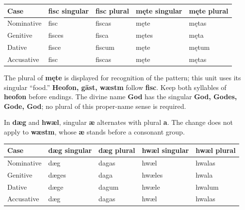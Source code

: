 \par\begingroup
\fontsize{10.5}{13.2}\selectfont
\setlength{\LTleft}{0pt}\setlength{\LTright}{\fill}
\noindent
\begin{tabular}{@{}>{\raggedright\arraybackslash}p{22.0mm}>{\raggedright\arraybackslash}p{22.688mm}>{\raggedright\arraybackslash}p{22.688mm}>{\raggedright\arraybackslash}p{22.688mm}>{\raggedright\arraybackslash}p{22.688mm}@{}}
\toprule
\textbf{Case} & \textbf{fisc singular} & \textbf{fisc plural} & \textbf{męte singular} & \textbf{męte plural} \\
\midrule
Nominative & fisc & fiscas & męte & mętas \\
Genitive & fisces & fisca & mętes & męta \\
Dative & fisce & fiscum & męte & mętum \\
Accusative & fisc & fiscas & męte & mętas \\
\bottomrule
\end{tabular}
\par\endgroup

The plural of \textbf{męte} is displayed for recognition of the pattern; this unit uses its singular “food.” \textbf{Heofon, gāst, wæstm} follow \textbf{fisc}. Keep both syllables of \textbf{heofon} before endings. The divine name \textbf{God} has the singular \textbf{God, Godes, Gode, God}; no plural of this proper-name sense is required.

In \textbf{dæg} and \textbf{hwæl}, singular \textbf{æ} alternates with plural \textbf{a}. The change does not apply to \textbf{wæstm}, whose \textbf{æ} stands before a consonant group.

\par\begingroup
\fontsize{10.5}{13.2}\selectfont
\setlength{\LTleft}{0pt}\setlength{\LTright}{\fill}
\noindent
\begin{tabular}{@{}>{\raggedright\arraybackslash}p{22.0mm}>{\raggedright\arraybackslash}p{22.688mm}>{\raggedright\arraybackslash}p{22.688mm}>{\raggedright\arraybackslash}p{22.688mm}>{\raggedright\arraybackslash}p{22.688mm}@{}}
\toprule
\textbf{Case} & \textbf{dæg singular} & \textbf{dæg plural} & \textbf{hwæl singular} & \textbf{hwæl plural} \\
\midrule
Nominative & dæg & dagas & hwæl & hwalas \\
Genitive & dæges & daga & hwæles & hwala \\
Dative & dæge & dagum & hwæle & hwalum \\
Accusative & dæg & dagas & hwæl & hwalas \\
\bottomrule
\end{tabular}
\par\endgroup

